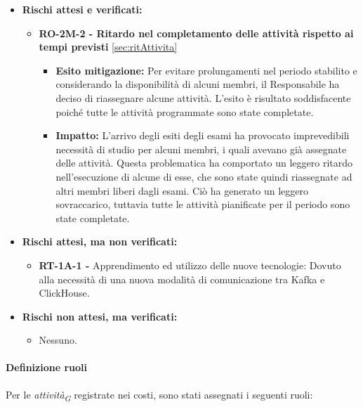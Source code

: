 \begin{itemize}
    \item \textbf{Rischi attesi e verificati:}
\begin{itemize}
    \item \textbf{RO-2M-2 - Ritardo nel completamento delle attività rispetto ai tempi previsti} \ref{sec:ritAttivita}
    \begin{itemize}
        \item \textbf{Esito mitigazione:} 
        Per evitare prolungamenti nel periodo stabilito e considerando la disponibilità di alcuni membri, il Responsabile ha deciso di riassegnare alcune attività. L'esito è risultato soddisfacente poiché tutte le attività programmate sono state completate.
        \item \textbf{Impatto:}
        L'arrivo degli esiti degli esami ha provocato imprevedibili necessità di studio per alcuni membri, i quali avevano già assegnate delle attività. Questa problematica ha comportato un leggero ritardo nell'esecuzione di alcune di esse, che sono state quindi riassegnate ad altri membri liberi dagli esami. Ciò ha generato un leggero sovraccarico, tuttavia tutte le attività pianificate per il periodo sono state completate.
    \end{itemize}
\end{itemize}
\item \textbf{Rischi attesi, ma non verificati:}
 \begin{itemize}
    \item  \textbf{RT-1A-1 -} Apprendimento ed utilizzo delle nuove tecnologie: Dovuto alla necessità di una nuova modalità di comunicazione tra Kafka e ClickHouse.
\end{itemize}
\item \textbf{Rischi non attesi, ma verificati:}
\begin{itemize}
    \item Nessuno.
\end{itemize}
\end{itemize}

\paragraph{Definizione ruoli}
Per le \textit{attività}\textsubscript{\textit{G}} registrate nei costi, sono stati assegnati i seguenti ruoli: 

\vspace{0.4cm}

